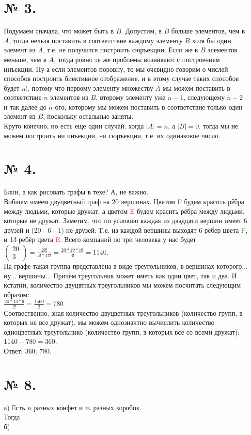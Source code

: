 \documentclass[a4paper,11pt]{report}
\begin{document}
\section{№ 3.}
Подумаем сначала, что может быть в $B$. Допустим, в $B$ больше элементов, чем в $A$,
тогда нельзя поставить в соответствие каждому элементу $B$ хотя бы один элемент из $A$,
т.е. не получится построить сюръекции. Если же в $B$ элементов меньше, чем в $A$, тогда
ровно те же проблемы возникают с построением инъекции. Ну а если элементов поровну, то 
мы очевидно говорим о числей способов построить биективное отображение, и в этому случае 
таких способов будет $n!$, потому что первому элементу множеству $A$ мы можем поставить 
в соответствие $n$ элементов из $B$, второму элементу уже $n - 1$, следующему $n - 2$ и так 
далее до $n$-ого, которому мы можем поставить в соответствие только один элемент из $B$, 
поскольку остальные заняты.\\
Круто конечно, но есть ещё один случай: когда $|A| = n$, а $|B| = 0$, тогда мы не можем 
построить ни инъекции, ни сюръекции, т.е. их одинаковое число.\\
\section{№ 4.}
Блин, а как рисовать графы в техе? А, не важно.\\
Вобщем имеем двуцветный граф на 20 вершинах. Цветом \textcolor{ForestGreen}{F} будем
красить рёбра между людьми, которые дружат, а цветом \textcolor{red}{E} будем 
красить рёбра между людьми, которые не дружат. Заметим, что по условию
каждая из двадцати вершин имеет 6 друзей и (20 - 6 - 1) не друзей.
Т.е. из каждой вершины выходят 6 рёбер цвета \textcolor{ForestGreen}{F}, и 13 ребёр
цвета \textcolor{red}{E}. Всего компаний по три человека у нас будет $
\begin{pmatrix}
20\\
3
\end{pmatrix}
= \frac{20!}{3! * 17!} = \frac{20 * 19 * 18}{3!} = 1140
$.\\
На графе такая группа представлена в виде треугольников, в вершинах которого... ну... вершины...
Причём треугольник
может иметь как один цвет, так и два. И кстатии, количество двуцвтных треугольников
мы можем посчитать следующим образом:\\
$\frac{20 * 13 * 6}{2!} = \frac{1560}{2} = 780$\\
Соотвественно, зная количество двуцветных треугольников (количество групп, в которых
не все дружат), мы можем однозначтно вычислить количество одноцветных треугольнико 
(количество групп, в которых все со всеми дружат):\\
$1140 - 780 = 360$.\\
Ответ: 360; 780.
\section{№ 8.}
а) Есть $n$ \underline{разных} конфет и $m$ \underline{разных} коробок.\\
Тогда\\
б) 
\end{document}
